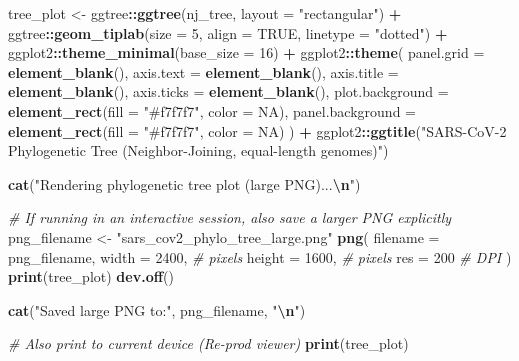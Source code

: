 \documentclass[
  11pt,
]{article}
\newenvironment{Shaded}{\begin{snugshade}}{\end{snugshade}}
\newcommand{\AttributeTok}[1]{\textcolor[rgb]{0.13,0.29,0.53}{#1}}
\newcommand{\CommentTok}[1]{\textcolor[rgb]{0.56,0.35,0.01}{\textit{#1}}}
\newcommand{\ConstantTok}[1]{\textcolor[rgb]{0.56,0.35,0.01}{#1}}
\newcommand{\DecValTok}[1]{\textcolor[rgb]{0.00,0.00,0.81}{#1}}
\newcommand{\FunctionTok}[1]{\textcolor[rgb]{0.13,0.29,0.53}{\textbf{#1}}}
\newcommand{\NormalTok}[1]{#1}
\newcommand{\OtherTok}[1]{\textcolor[rgb]{0.56,0.35,0.01}{#1}}
\newcommand{\SpecialCharTok}[1]{\textcolor[rgb]{0.81,0.36,0.00}{\textbf{#1}}}
\newcommand{\StringTok}[1]{\textcolor[rgb]{0.31,0.60,0.02}{#1}}
\begin{document}
\begin{Shaded}
\begin{Highlighting}[]
\NormalTok{tree\_plot }\OtherTok{\textless{}{-}}\NormalTok{ ggtree}\SpecialCharTok{::}\FunctionTok{ggtree}\NormalTok{(nj\_tree, }\AttributeTok{layout =} \StringTok{"rectangular"}\NormalTok{) }\SpecialCharTok{+}
\NormalTok{  ggtree}\SpecialCharTok{::}\FunctionTok{geom\_tiplab}\NormalTok{(}\AttributeTok{size =} \DecValTok{5}\NormalTok{, }\AttributeTok{align =} \ConstantTok{TRUE}\NormalTok{, }\AttributeTok{linetype =} \StringTok{"dotted"}\NormalTok{) }\SpecialCharTok{+}
\NormalTok{  ggplot2}\SpecialCharTok{::}\FunctionTok{theme\_minimal}\NormalTok{(}\AttributeTok{base\_size =} \DecValTok{16}\NormalTok{) }\SpecialCharTok{+}
\NormalTok{  ggplot2}\SpecialCharTok{::}\FunctionTok{theme}\NormalTok{(}
    \AttributeTok{panel.grid =} \FunctionTok{element\_blank}\NormalTok{(),}
    \AttributeTok{axis.text =} \FunctionTok{element\_blank}\NormalTok{(),}
    \AttributeTok{axis.title =} \FunctionTok{element\_blank}\NormalTok{(),}
    \AttributeTok{axis.ticks =} \FunctionTok{element\_blank}\NormalTok{(),}
    \AttributeTok{plot.background =} \FunctionTok{element\_rect}\NormalTok{(}\AttributeTok{fill =} \StringTok{"\#f7f7f7"}\NormalTok{, }\AttributeTok{color =} \ConstantTok{NA}\NormalTok{),}
    \AttributeTok{panel.background =} \FunctionTok{element\_rect}\NormalTok{(}\AttributeTok{fill =} \StringTok{"\#f7f7f7"}\NormalTok{, }\AttributeTok{color =} \ConstantTok{NA}\NormalTok{)}
\NormalTok{  ) }\SpecialCharTok{+}
\NormalTok{  ggplot2}\SpecialCharTok{::}\FunctionTok{ggtitle}\NormalTok{(}\StringTok{"SARS{-}CoV{-}2 Phylogenetic Tree (Neighbor{-}Joining, equal{-}length genomes)"}\NormalTok{)}

\FunctionTok{cat}\NormalTok{(}\StringTok{"Rendering phylogenetic tree plot (large PNG)...}\SpecialCharTok{\textbackslash{}n}\StringTok{"}\NormalTok{)}

\CommentTok{\# If running in an interactive session, also save a larger PNG explicitly}
\NormalTok{png\_filename }\OtherTok{\textless{}{-}} \StringTok{"sars\_cov2\_phylo\_tree\_large.png"}
\FunctionTok{png}\NormalTok{(}
  \AttributeTok{filename =}\NormalTok{ png\_filename,}
  \AttributeTok{width =} \DecValTok{2400}\NormalTok{,   }\CommentTok{\# pixels}
  \AttributeTok{height =} \DecValTok{1600}\NormalTok{,  }\CommentTok{\# pixels}
  \AttributeTok{res =} \DecValTok{200}       \CommentTok{\# DPI}
\NormalTok{)}
\FunctionTok{print}\NormalTok{(tree\_plot)}
\FunctionTok{dev.off}\NormalTok{()}

\FunctionTok{cat}\NormalTok{(}\StringTok{"Saved large PNG to:"}\NormalTok{, png\_filename, }\StringTok{"}\SpecialCharTok{\textbackslash{}n}\StringTok{"}\NormalTok{)}

\CommentTok{\# Also print to current device (Re{-}prod viewer)}
\FunctionTok{print}\NormalTok{(tree\_plot)}
\end{Highlighting}
\end{Shaded}
\end{document}
